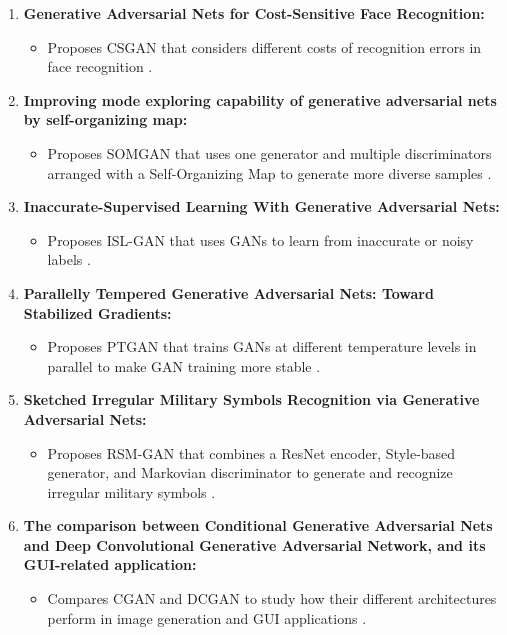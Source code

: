 \documentclass[12pt,a4paper]{report}
\begin{document}
\begin{justify}
\begin{enumerate}
    \item \textbf{Generative Adversarial Nets for Cost-Sensitive Face Recognition:}
    \begin{itemize}
        \item Proposes CSGAN that considers different costs of recognition errors in face recognition \parencite{chen2020generative}.
    \end{itemize}

    \item \textbf{Improving mode exploring capability of generative adversarial nets by self-organizing map:}
    \begin{itemize}
        \item Proposes SOMGAN that uses one generator and multiple discriminators arranged with a Self-Organizing Map to generate more diverse samples \parencite{li2024improving}.
    \end{itemize}

    \item \textbf{Inaccurate-Supervised Learning With Generative Adversarial Nets:}
    \begin{itemize}
        \item Proposes ISL-GAN that uses GANs to learn from inaccurate or noisy labels \parencite{zhang2023inaccurate}.
    \end{itemize}

    \item \textbf{Parallelly Tempered Generative Adversarial Nets: Toward Stabilized Gradients:}
    \begin{itemize}
        \item Proposes PTGAN that trains GANs at different temperature levels in parallel to make GAN training more stable \parencite{sohn2026parallelly}.
    \end{itemize}

    \item \textbf{Sketched Irregular Military Symbols Recognition via Generative Adversarial Nets:}
    \begin{itemize}
        \item Proposes RSM-GAN that combines a ResNet encoder, Style-based generator, and Markovian discriminator to generate and recognize irregular military symbols \parencite{zuo2023sketched}.
    \end{itemize}

    \item \textbf{The comparison between Conditional Generative Adversarial Nets and Deep Convolutional Generative Adversarial Network, and its GUI-related application:}
    \begin{itemize}
        \item Compares CGAN and DCGAN to study how their different architectures perform in image generation and GUI applications \parencite{li2021comparison}.
    \end{itemize}
\end{enumerate}


\end{justify}
\end{document}
